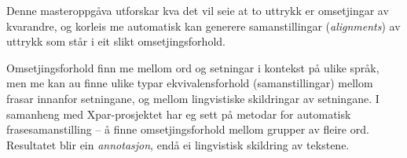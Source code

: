 \documentclass[12pt,a4paper,oneside,draft]{report}
\begin{document}
\label{SEC:innleiing}




Denne masteroppgåva utforskar kva det vil seie at to uttrykk er
omsetjingar av kvarandre, og korleis me automatisk kan generere
samanstillingar (\emph{alignments}) av uttrykk som står i eit slikt
omsetjingsforhold.

Omsetjingsforhold finn me mellom ord og setningar i kontekst på ulike
språk, men me kan au finne ulike typar ekvivalensforhold
(samanstillingar) mellom frasar innanfor setningane, og mellom
lingvistiske skildringar av setningane. I samanheng med
Xpar-prosjektet \citep{xpar2008rcn,dyvik2009lmp} har eg sett på metodar for
automatisk frasesamanstilling – å finne omsetjingsforhold mellom
grupper av fleire ord. Resultatet blir ein \emph{annotasjon}, endå ei
lingvistisk skildring av tekstene.
\end{document}
